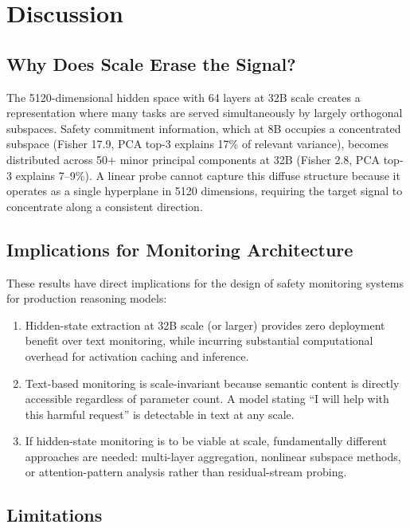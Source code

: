 \documentclass[11pt]{article}
\begin{document}
\section{Discussion}

\subsection{Why Does Scale Erase the Signal?}

The 5120-dimensional hidden space with 64 layers at 32B scale creates a representation where many tasks are served simultaneously by largely orthogonal subspaces. Safety commitment information, which at 8B occupies a concentrated subspace (Fisher 17.9, PCA top-3 explains 17\% of relevant variance), becomes distributed across 50+ minor principal components at 32B (Fisher 2.8, PCA top-3 explains 7--9\%). A linear probe cannot capture this diffuse structure because it operates as a single hyperplane in 5120 dimensions, requiring the target signal to concentrate along a consistent direction.

\subsection{Implications for Monitoring Architecture}

These results have direct implications for the design of safety monitoring systems for production reasoning models:

\begin{enumerate}
\item Hidden-state extraction at 32B scale (or larger) provides zero deployment benefit over text monitoring, while incurring substantial computational overhead for activation caching and inference.
\item Text-based monitoring is scale-invariant because semantic content is directly accessible regardless of parameter count. A model stating ``I will help with this harmful request'' is detectable in text at any scale.
\item If hidden-state monitoring is to be viable at scale, fundamentally different approaches are needed: multi-layer aggregation, nonlinear subspace methods, or attention-pattern analysis rather than residual-stream probing.
\end{enumerate}

\subsection{Limitations}
\end{document}
